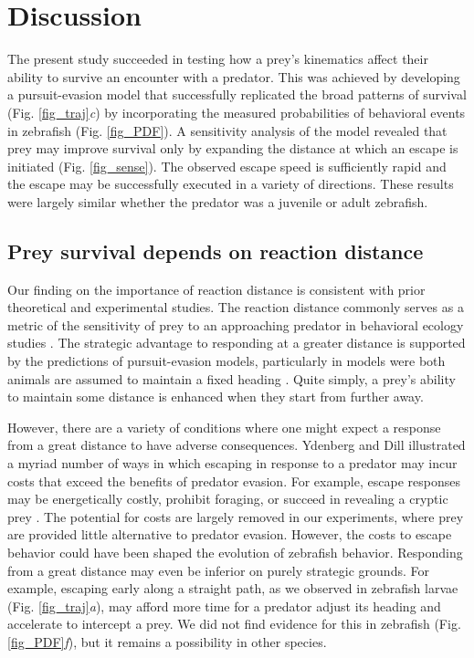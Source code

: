 \documentclass[]{rsos}%
\begin{document}
\section{Discussion}%

The present study succeeded in testing how a prey's kinematics affect their ability to survive an encounter with a predator.
This was achieved by developing a pursuit-evasion model that successfully replicated the broad patterns of survival (Fig. \ref{fig_traj}\textit{c}) by incorporating the measured probabilities of behavioral events in zebrafish (Fig. \ref{fig_PDF}).
A sensitivity analysis of the model revealed that prey may improve survival only by expanding the distance at which an escape is initiated (Fig. \ref{fig_sense}). 
The observed escape speed is sufficiently rapid and the escape may be successfully executed in a variety of directions.
These results were largely similar whether the predator was a juvenile or adult zebrafish.


\subsection{Prey survival depends on reaction distance} 

Our finding on the importance of reaction distance is consistent with prior theoretical and experimental studies.
The reaction distance commonly serves as a metric of the sensitivity of prey to an approaching predator in behavioral ecology studies \cite{Cooper:2015vf}.
The strategic advantage to responding at a greater distance is supported by the predictions of pursuit-evasion models, particularly in models were both animals are assumed to maintain a fixed heading \cite{Isaacs:1965uz,Weihs:1984tb,Soto:2015cj}. 
Quite simply, a prey's ability to maintain some distance is enhanced when they start from further away.

However, there are a variety of conditions where one might expect a response from a great distance to have adverse consequences.
Ydenberg and Dill \cite{Ydenberg:1986tm} illustrated a myriad number of ways in which escaping in response to a predator may incur costs that exceed the benefits of predator evasion.
For example, escape responses may be energetically costly, prohibit foraging, or succeed in revealing a cryptic prey \cite{Cooper:2015vf,Broom:2005gq}.
The potential for costs are largely removed in our experiments, where prey are provided little alternative to predator evasion.
However, the costs to escape behavior could have been shaped the evolution of zebrafish behavior.
Responding from a great distance may even be inferior on purely strategic grounds. 
For example, escaping early along a straight path, as we observed in zebrafish larvae (Fig. \ref{fig_traj}\textit{a}), may afford more time for a predator adjust its heading and accelerate to intercept a prey. 
We did not find evidence for this in zebrafish (Fig. \ref{fig_PDF}\textit{f}), but it remains a possibility in other species.
\end{document}
